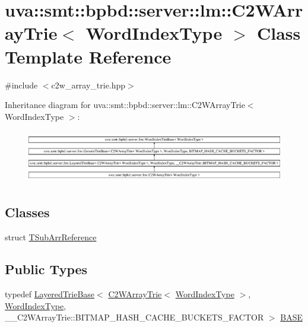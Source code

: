 \hypertarget{classuva_1_1smt_1_1bpbd_1_1server_1_1lm_1_1_c2_w_array_trie}{}\section{uva\+:\+:smt\+:\+:bpbd\+:\+:server\+:\+:lm\+:\+:C2\+W\+Array\+Trie$<$ Word\+Index\+Type $>$ Class Template Reference}
\label{classuva_1_1smt_1_1bpbd_1_1server_1_1lm_1_1_c2_w_array_trie}


{\ttfamily \#include $<$c2w\+\_\+array\+\_\+trie.\+hpp$>$}

Inheritance diagram for uva\+:\+:smt\+:\+:bpbd\+:\+:server\+:\+:lm\+:\+:C2\+W\+Array\+Trie$<$ Word\+Index\+Type $>$\+:\begin{figure}[H]
\begin{center}
\leavevmode
\includegraphics[height=2.360379cm]{classuva_1_1smt_1_1bpbd_1_1server_1_1lm_1_1_c2_w_array_trie}
\end{center}
\end{figure}
\subsection*{Classes}
\begin{DoxyCompactItemize}
\item 
struct \hyperlink{structuva_1_1smt_1_1bpbd_1_1server_1_1lm_1_1_c2_w_array_trie_1_1_t_sub_arr_reference}{T\+Sub\+Arr\+Reference}
\end{DoxyCompactItemize}
\subsection*{Public Types}
\begin{DoxyCompactItemize}
\item 
typedef \hyperlink{classuva_1_1smt_1_1bpbd_1_1server_1_1lm_1_1_layered_trie_base}{Layered\+Trie\+Base}$<$ \hyperlink{classuva_1_1smt_1_1bpbd_1_1server_1_1lm_1_1_c2_w_array_trie}{C2\+W\+Array\+Trie}$<$ \hyperlink{classuva_1_1smt_1_1bpbd_1_1server_1_1lm_1_1_word_index_trie_base_a77ee32bf3a9f8a89558bda4f2031200c}{Word\+Index\+Type} $>$, \hyperlink{classuva_1_1smt_1_1bpbd_1_1server_1_1lm_1_1_word_index_trie_base_a77ee32bf3a9f8a89558bda4f2031200c}{Word\+Index\+Type}, \+\_\+\+\_\+\+C2\+W\+Array\+Trie\+::\+B\+I\+T\+M\+A\+P\+\_\+\+H\+A\+S\+H\+\_\+\+C\+A\+C\+H\+E\+\_\+\+B\+U\+C\+K\+E\+T\+S\+\_\+\+F\+A\+C\+T\+O\+R $>$ \hyperlink{classuva_1_1smt_1_1bpbd_1_1server_1_1lm_1_1_c2_w_array_trie_a41928028d8a20a85548496b5e0ce3759}{B\+A\+S\+E}
\end{DoxyCompactItemize}
